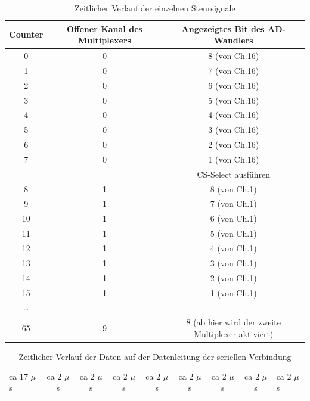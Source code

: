 \begin{table}
	\centering
	\begin{tabular}{ccc}
		Counter & Offener Kanal des Multiplexers & Angezeigtes Bit des AD-Wandlers \\ \hline
		0&0&8 (von Ch.16)\\
		1&0&7 (von Ch.16)\\
		2&0&6 (von Ch.16)\\
		3&0&5 (von Ch.16)\\
		4&0&4 (von Ch.16)\\
		5&0&3 (von Ch.16)\\
		6&0&2 (von Ch.16)\\
		7&0&1 (von Ch.16)\\
		&&CS-Select ausführen\\
		8&1&8 (von Ch.1)\\
		9&1&7 (von Ch.1)\\
		10&1&6 (von Ch.1)\\
		11&1&5 (von Ch.1)\\
		12&1&4 (von Ch.1)\\
		13&1&3 (von Ch.1)\\
		14&1&2 (von Ch.1)\\
		15&1&1 (von Ch.1)\\
		\dots&&\\
		65&9&8 (ab hier wird der zweite Multiplexer aktiviert)
		
	\end{tabular}
	\caption{Zeitlicher Verlauf der einzelnen Steursignale}
	\label{pic002}
\end{table}

\begin{table}[t]
	\centering
	\begin{tabular}{lccccccc}
	ca 17 $\mu$s & ca 2 $\mu$s & ca 2 $\mu$s &ca 2 $\mu$s &ca 2 $\mu$s &ca 2 $\mu$s &ca 2 $\mu$s &ca 2 $\mu$s &ca 2 $\mu$s &\\
	
	\end{tabular}
	\caption{Zeitlicher Verlauf der Daten auf der Datenleitung der seriellen Verbindung}
	\label{pic003}
\end{table}